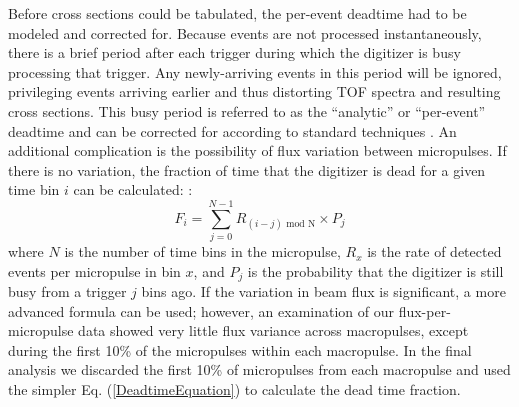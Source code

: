 \documentclass[twocolumn,secnumarabic,amssymb, nobibnotes, aps, prl,
superscriptaddress, nobalancelastpage]{revtex4}
\begin{document}
Before cross sections could be tabulated, the per-event deadtime had to be
modeled and corrected for. Because events are not processed
instantaneously, there is a brief period
after each trigger during which the digitizer is busy processing that trigger.
Any newly-arriving events in this period will be ignored,
privileging events arriving earlier and thus distorting
TOF spectra and resulting cross sections. This busy period is referred to as the
``analytic'' or ``per-event'' deadtime and can be corrected for according to standard 
techniques
\cite{Moore1980}. An additional complication is the possibility of flux
variation between micropulses. If there is no variation, the fraction of time
that the digitizer is dead for a given time bin $i$ can be calculated:
\cite{Moore1980}:
\begin{equation}
    F_{i} = \sum^{N-1}_{j=0} R_{(i-j)\text{ mod N}}\times P_{j}
    \label{DeadtimeEquation}
\end{equation}
where $N$ is the number of time bins in the micropulse, $R_{x}$ is the rate of
detected events per micropulse in bin $x$, and $P_{j}$ is the probability that the
digitizer is still busy from a trigger $j$ bins ago.
If the variation in beam flux is significant, a more advanced formula can be
used; however, an examination of our flux-per-micropulse data showed
very little flux variance across macropulses, except during the first 10\%
of the micropulses within each macropulse. In the final analysis we discarded the
first 10\% of micropulses from each macropulse and used the simpler Eq.
(\ref{DeadtimeEquation}) to calculate the dead time fraction.
\end{document}
